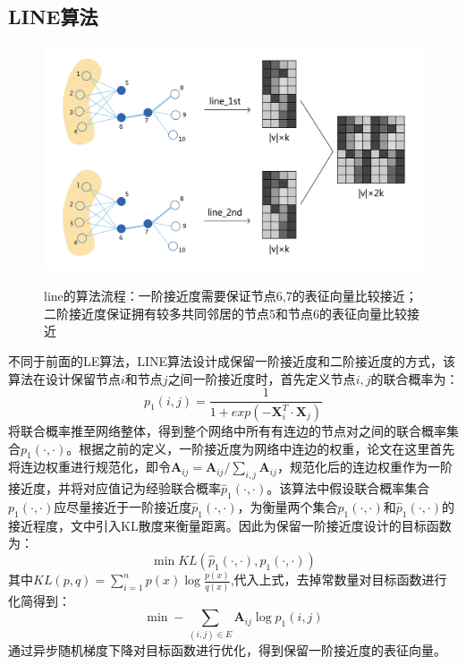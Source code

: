\subsection{LINE算法}
 \begin{figure}[!ht]
	\centering
	{\includegraphics[width=5in]{figures/line.png}}
	\caption{line的算法流程：一阶接近度需要保证节点6,7的表征向量比较接近；二阶接近度保证拥有较多共同邻居的节点5和节点6的表征向量比较接近}\label{line_process}
\end{figure}
 不同于前面的LE算法，LINE算法设计成保留一阶接近度和二阶接近度的方式，该算法在设计保留节点$i$和节点$j$之间一阶接近度时，首先定义节点$i,j$的联合概率为：
 \begin{equation}
 p_1(i,j) = \frac{1}{1+exp(-\textbf{X}_i^T \cdot \textbf{X}_j)}
 \end{equation}
 将联合概率推至网络整体，得到整个网络中所有有连边的节点对之间的联合概率集合$p_1(\cdot,\cdot)$。根据之前的定义，一阶接近度为网络中连边的权重，论文在这里首先将连边权重进行规范化，即令$\textbf{A}_{ij} =\textbf{A}_{ij}/\sum_{i,j}\textbf{A}_{ij} $，规范化后的连边权重作为一阶接近度，并将对应值记为经验联合概率$\hat{p}_1(\cdot,\cdot)$。该算法中假设联合概率集合$p_1(\cdot,\cdot)$应尽量接近于一阶接近度$\hat{p}_1(\cdot,\cdot)$，为衡量两个集合$p_1(\cdot, \cdot)$和$\hat{p}_1(\cdot,\cdot)$的接近程度，文中引入KL散度来衡量距离。因此为保留一阶接近度设计的目标函数为：
 \begin{equation}
 	\min KL(\hat{p}_1(\cdot, \cdot),p_1(\cdot,\cdot))
 \end{equation}
 其中$KL(p,q) = \sum_{i=1}^{n}p(x)\log\frac{p(x)}{q(x)}$,代入上式，去掉常数量对目标函数进行化简得到：
 \begin{equation}\label{line_1st}
 	\min -\sum_{(i,j) \in E} \textbf{A}_{ij}\log p_1(i,j)
 \end{equation}
 通过异步随机梯度下降对目标函数进行优化，得到保留一阶接近度的表征向量。
 
